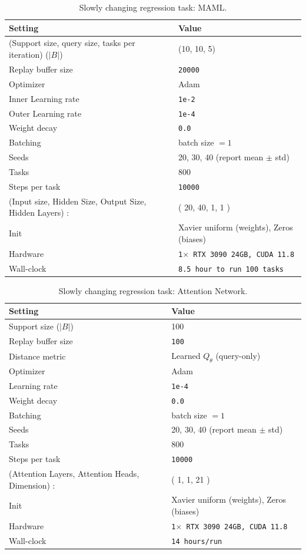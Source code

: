 \documentclass{article}
\begin{document}
\begin{table}[H]
\centering
\footnotesize
\caption{Slowly changing regression task: MAML.}
\label{tab:scr_maml}
\begin{tabular}{@{}ll@{}}
\toprule
Setting & Value \\ \midrule
(Support size, query size, tasks per iteration) ($|B|$) & (10, 10, 5) \\
Replay buffer size & \texttt{20000} \\
Optimizer & Adam \\
Inner Learning rate & \texttt{1e-2} \\
Outer Learning rate & \texttt{1e-4} \\
Weight decay & \texttt{0.0} \\
Batching & batch size $=1$ \\
Seeds & 20, 30, 40 (report mean $\pm$ std) \\
Tasks & 800 \\
Steps per task & \texttt{10000} \\
(Input size, Hidden Size, Output Size, Hidden Layers) : & ( 20, 40, 1, 1 ) \\ 
Init & Xavier uniform (weights), Zeros (biases)\\
Hardware & \texttt{1$\times$ RTX 3090 24GB, CUDA 11.8} \\
Wall-clock & \texttt{8.5 hour to run 100 tasks} \\
\bottomrule
\end{tabular}
\end{table}


\begin{table}[H]
\centering
\footnotesize
\caption{Slowly changing regression task: Attention Network.}
\label{tab:scr_attention}
\begin{tabular}{@{}ll@{}}
\toprule
Setting & Value \\ \midrule
Support size ($|B|$) & 100 \\
Replay buffer size & \texttt{100} \\
Distance metric & Learned $Q_{\theta}$ (query-only) \\
Optimizer & Adam \\
Learning rate & \texttt{1e-4} \\
Weight decay & \texttt{0.0} \\
Batching & batch size $=1$ \\
Seeds & 20, 30, 40 (report mean $\pm$ std) \\
Tasks & 800 \\
Steps per task & \texttt{10000} \\
(Attention Layers, Attention Heads, Dimension) : & ( 1, 1, 21 ) \\ 
Init & Xavier uniform (weights), Zeros (biases)\\
Hardware & \texttt{1$\times$ RTX 3090 24GB, CUDA 11.8} \\
Wall-clock & \texttt{14 hours/run} \\
\bottomrule
\end{tabular}
\end{table}
\end{document}
